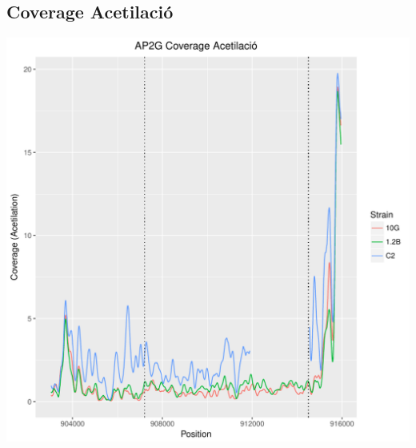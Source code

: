\documentclass{article}\usepackage[]{graphicx}\usepackage[]{color}
\newenvironment{knitrout}{}{} %
\begin{document}
\subsection{Coverage Acetilació}
\begin{knitrout}
\color{fgcolor}
\includegraphics[width=1\linewidth]{figure/plot_ac-1} 

\end{knitrout}
\clearpage
\end{document}
